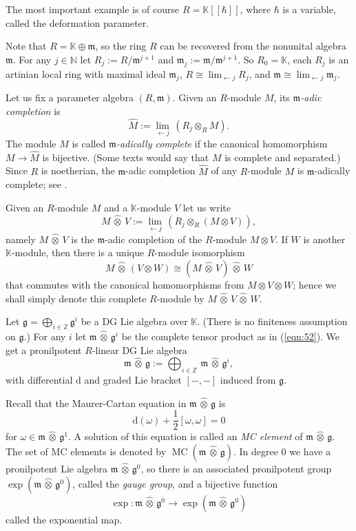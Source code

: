 \documentclass[a4paper,10pt]{amsart}
\theoremstyle{definition}
\numberwithin{equation}{section}
\newcommand{\opn}{\operatorname}
\newcommand{\mfrak}[1]{\mathfrak{#1}}
\newcommand{\mrm}[1]{\mathrm{#1}}
\newcommand{\mbb}[1]{\mathbb{#1}}
\newcommand{\smfrac}[2]{\textstyle \frac{#1}{#2}}
\newcommand{\boplus}{\bigoplus\nolimits}
\newcommand{\ot}{\otimes}
\newcommand{\what}[1]{\widehat{#1}}
\newcommand{\hatotimes}{\, \what{\otimes} \,}
\newcommand{\hot}{\hatotimes}
\newcommand{\K}{\mbb{K}}
\newcommand{\N}{\mbb{N}}
\newcommand{\Z}{\mbb{Z}}
\newcommand{\g}{\mfrak{g}}
\newcommand{\m}{\mfrak{m}}
\renewcommand{\d}{\mrm{d}}
\begin{document}
The most important example is of course
$R = \K[[\hbar]]$, where $\hbar$ is a variable, called the deformation
parameter.

Note that $R = \K \oplus \m$, so the ring $R$ can be recovered from the
nonunital algebra $\m$. For any $j \in \N$ let $R_j := R / \m^{j+1}$ and 
$\m_j := \m / \m^{j+1}$. So $R_0 = \K$, each $R_j$ is an artinian local ring
with maximal ideal $\m_j$, 
$R \cong \lim_{\leftarrow j} R_j$,
and
$\m \cong  \lim_{\leftarrow j} \m_j$.

Let us fix a parameter algebra $(R, \m)$.
Given an $R$-module $M$, its {\em $\m$-adic completion} is
\[ \what{M} := \lim_{\leftarrow j}\, (R_j \ot_R M) . \]
The module $M$ is called {\em $\m$-adically complete} if the canonical
homomorphism $M \to \what{M}$ is bijective. (Some texts would say that $M$ is
complete and separated.) Since $R$ is noetherian, the $\m$-adic completion
$\what{M}$ of any $R$-module $M$ is $\m$-adically complete; 
see \cite[Corollary 3.5]{Ye5}.

Given an $R$-module $M$ and a $\K$-module $V$ let us write 
\begin{equation} \label{eqn:52}
M \hot V := \lim_{\leftarrow j}\, (R_j \ot_R (M \ot V)) , 
\end{equation}
namely $M \hot V$ is the $\m$-adic completion of the $R$-module $M \ot V$. 
If $W$ is another $\K$-module, then there is a unique $R$-module isomorphism
\[ M \hot (V \ot W) \cong (M \hot V) \hot W \]
that commutes with the canonical homomorphisms from 
$M \ot V \ot W$; hence we shall simply denote this complete $R$-module by 
$M \hot V \hot W$.

Let $\g = \boplus_{i \in \Z} \g^i$ be a DG Lie algebra over $\K$.
(There is no finiteness assumption on $\g$.)
For any $i$ let $\m \hatotimes \g^i$ be the complete tensor product
as in (\ref{eqn:52}).
We get a pronilpotent $R$-linear DG Lie algebra 
\begin{equation} \label{eqn:64}
\m \hatotimes \g := \bigoplus_{i \in \Z}\, \m \hatotimes \g^i , 
\end{equation}
with differential $\d$ and graded Lie bracket  $[-,-]$ induced from $\g$. 

Recall that the Maurer-Cartan equation in $\m \hatotimes \g$ is
\begin{equation}
\d(\omega) + \smfrac{1}{2} [\omega, \omega] = 0
\end{equation}
for $\omega \in \m \hatotimes \g^1$.
A solution of this equation is called an {\em MC element}
of $\m \hatotimes \g$. The set of MC elements is denoted by 
$\opn{MC}(\m \hatotimes \g)$. 
In degree $0$ we have a pronilpotent Lie algebra $\m \hatotimes \g^0$,
so there is an associated pronilpotent group 
$\exp(\m \hatotimes \g^0)$, called the {\em gauge group}, and 
a bijective function 
\[ \exp : \m \hot \g^0 \to \exp(\m \hot \g^0) \]
called the exponential map.
\end{document}
